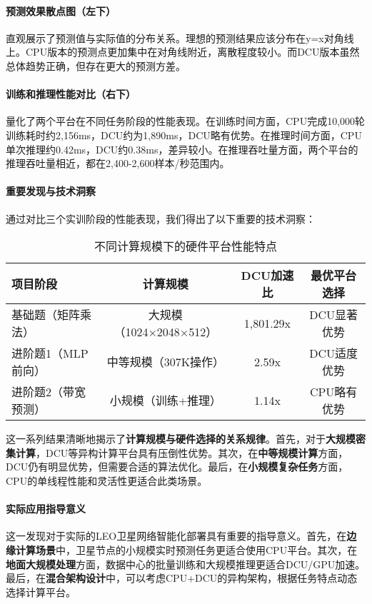 \documentclass[a4paper]{article}
\begin{document}
\paragraph{预测效果散点图（左下）}直观展示了预测值与实际值的分布关系。理想的预测结果应该分布在y=x对角线上。CPU版本的预测点更加集中在对角线附近，离散程度较小。而DCU版本虽然总体趋势正确，但存在更大的预测方差。

\paragraph{训练和推理性能对比（右下）}量化了两个平台在不同任务阶段的性能表现。在训练时间方面，CPU完成10,000轮训练耗时约2,156ms，DCU约为1,890ms，DCU略有优势。在推理时间方面，CPU单次推理约0.42ms，DCU约0.38ms，差异较小。在推理吞吐量方面，两个平台的推理吞吐量相近，都在2,400-2,600样本/秒范围内。

\paragraph{重要发现与技术洞察}

通过对比三个实训阶段的性能表现，我们得出了以下重要的技术洞察：

\begin{table}[h]
\centering
\begin{tabular}{@{}lccc@{}}
\toprule
项目阶段 & 计算规模 & DCU加速比 & 最优平台选择 \\
\midrule
基础题（矩阵乘法） & 大规模（1024×2048×512） & 1,801.29x & DCU显著优势 \\
进阶题1（MLP前向） & 中等规模（307K操作） & 2.59x & DCU适度优势 \\
进阶题2（带宽预测） & 小规模（训练+推理） & 1.14x & CPU略有优势 \\
\bottomrule
\end{tabular}
\caption{不同计算规模下的硬件平台性能特点}
\end{table}

这一系列结果清晰地揭示了\textbf{计算规模与硬件选择的关系规律}。首先，对于\textbf{大规模密集计算}，DCU等异构计算平台具有压倒性优势。其次，在\textbf{中等规模计算}方面，DCU仍有明显优势，但需要合适的算法优化。最后，在\textbf{小规模复杂任务}方面，CPU的单线程性能和灵活性更适合此类场景。

\paragraph{实际应用指导意义}

这一发现对于实际的LEO卫星网络智能化部署具有重要的指导意义。首先，在\textbf{边缘计算场景}中，卫星节点的小规模实时预测任务更适合使用CPU平台。其次，在\textbf{地面大规模处理}方面，数据中心的批量训练和大规模推理更适合DCU/GPU加速。最后，在\textbf{混合架构设计}中，可以考虑CPU+DCU的异构架构，根据任务特点动态选择计算平台。
\end{document}
